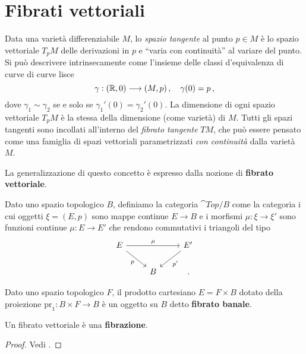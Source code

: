 
\chapter{Fibrati vettoriali}



Data una varietà differenziabile $M$, lo \emph{spazio tangente} al punto $p \in M$
è lo spazio vettoriale $T_{p}M$ delle derivazioni in $p$ e ``varia con continuità''
al variare del punto. Si può descrivere intrinsecamente
come l'insieme delle classi d'equivalenza di curve di curve lisce
\begin{equation*}
	\gamma : ({\mathbb R},0) \longrightarrow (M,p)\,, \quad \gamma(0) = p\,,
\end{equation*}
dove $\gamma_{1} \sim \gamma_{2}$ se e solo se $\gamma_{1}'(0) = \gamma_{2}'(0)$.
La dimensione di ogni spazio vettoriale $T_{p}M$ è 
la stessa della dimensione (come varietà) di $M$.
Tutti gli spazi tangenti sono incollati all'interno
del \emph{fibrato tangente} $TM$, che può essere pensato come
una famiglia di spazi vettoriali 
parametrizzati \emph{con continuità} dalla varietà $M$.

La generalizzazione di questo concetto è espresso dalla nozione
di \textbf{fibrato vettoriale}.

\begin{df}
	Dato uno spazio topologico $B$, definiamo la categoria $\cat{Top}/B$
	come la categoria i cui oggetti $\xi = (E,p)$ sono mappe continue $E \to B$
	e i morfismi $\mu : \xi \to \xi'$ sono
	funzioni continue $\mu :E \to E'$ che rendono commutativi i triangoli del tipo
	\begin{equation*}
		\begin{tikzcd}
			E \ar[rr, "\mu"] \ar[dr, "p"'] & & E' \ar[dl,, "p'"] \\
			& B & \,.
		\end{tikzcd}
	\end{equation*}
\end{df}

\begin{ex}
	Dato uno spazio topologico $F$, il prodotto cartesiano $E = F \times B$
	dotato della proiezione $\mathrm{pr}_{1}:B \times F \to B$ è un
	oggetto su $B$ detto \textbf{fibrato banale}.
\end{ex}

\begin{thm}
	Un fibrato vettoriale è una \textbf{fibrazione}.
	\begin{proof}
		Vedi \parencite[Proposition~4.48]{hatcher}.
	\end{proof}
\end{thm}

